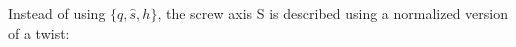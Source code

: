 \documentclass[preview]{standalone}
\begin{document}
\begin{center}
Instead of using $\{q, \hat{s}, h\}$, the screw axis S is described using a normalized version of a twist:
\end{center}
\end{document}
